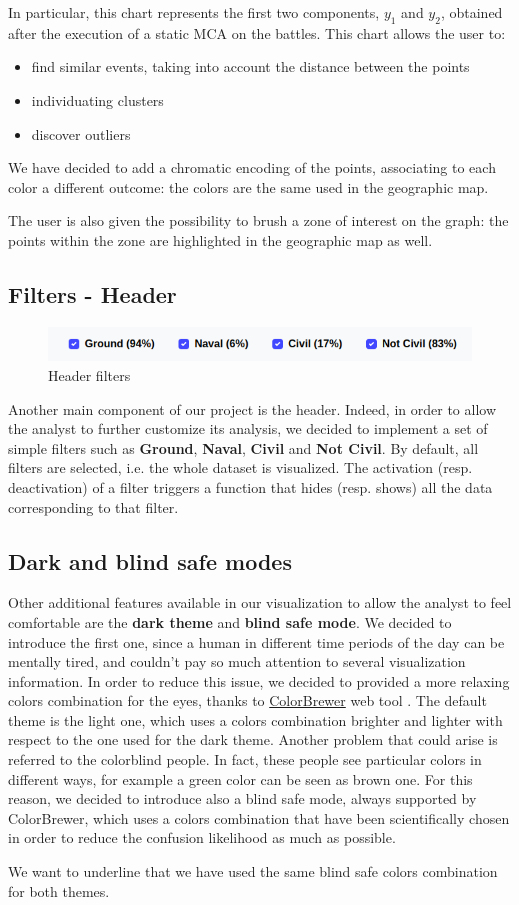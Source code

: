 In particular, this chart represents the first two components, $y_1$ and $y_2$, obtained after the execution of a static MCA on the battles. This chart allows the user to:
\begin{itemize}
    \item find similar events, taking into account the distance between the points
    \item individuating clusters
    \item discover outliers
\end{itemize}

We have decided to add a chromatic encoding of the points, associating to each color a different outcome: the colors are the same used in the geographic map.

The user is also given the possibility to brush a zone of interest on the graph: the points within the zone are highlighted in the geographic map as well.

\subsection{Filters - Header}
\begin{figure}[h]
    \centering
    \includegraphics[scale=0.32]{./images/header_filters.png}
    \caption{Header filters}
\end{figure}
Another main component of our project is the header. Indeed, in order to allow the analyst to further customize its analysis, we decided to implement a set of simple filters such as \textbf{Ground}, \textbf{Naval}, \textbf{Civil} and \textbf{Not Civil}. By default, all filters are selected, i.e. the whole dataset is visualized. The activation (resp. deactivation) of a filter triggers a function that hides (resp. shows) all the data corresponding to that filter.

\subsection{Dark and blind safe modes}
Other additional features available in our visualization to allow the analyst to feel comfortable are the \textbf{dark theme} and \textbf{blind safe mode}. We decided to introduce the first one, since a human in different time periods of the day can be mentally tired, and couldn't pay so much attention to several visualization information. In order to reduce this issue, we decided to provided a more relaxing colors combination for the eyes, thanks to \href{https://colorbrewer2.org/}{ColorBrewer} web tool \cite{HB03}. The default theme is the light one, which uses a colors combination brighter and lighter with respect to the one used for the dark theme. Another problem that could arise is referred to the colorblind people. In fact, these people see particular colors in different ways, for example a green color can be seen as brown one. For this reason, we decided to introduce also a blind safe mode, always supported by ColorBrewer, which uses a colors combination that have been scientifically chosen in order to reduce the confusion likelihood as much as possible.

We want to underline that we have used the same blind safe colors combination for both themes.